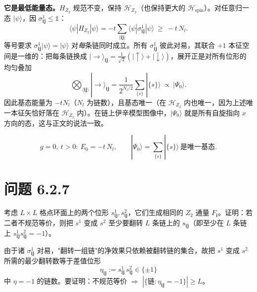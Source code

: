 \textbf{它是最低能量态。}$H_{Z_2}$ 规范不变，保持 $\mathcal{H}_{Z_2}$（也保持更大的 $\mathcal{H}_{\text{spin}}$）。对任意归一态 $|\psi\rangle$，因 $\sigma^1_{\pmb{ij}}\leqslant\mathbb{1}$：
\begin{equation*}
\langle\psi|H_{Z_2}|\psi\rangle
=-t\sum_{\langle\pmb{ij}\rangle}\langle\psi|\sigma^1_{\pmb{ij}}|\psi\rangle
\ \geqslant\ -t\,N_l .
\end{equation*}
等号要求 $\sigma^1_{\pmb{ij}}|\psi\rangle=|\psi\rangle$ 对\emph{每}条链同时成立。所有 $\sigma^1_{\pmb{ij}}$ 彼此对易，其联合 $+1$ 本征空间是一维的：把每条链换成 $|\rightarrow\rangle_{\pmb{ij}}=\frac{1}{\sqrt2}(|\uparrow\rangle+|\downarrow\rangle)$，展开正是对所有位形的均匀叠加
\begin{equation*}
\bigotimes_{\langle\pmb{ij}\rangle}|\rightarrow\rangle_{\pmb{ij}}
=\frac{1}{2^{N_l/2}}\sum_{\{s\}}|\{s\}\rangle\ \propto\ |\Psi_0\rangle .
\end{equation*}
因此基态能量为 $-tN_l$（$N_l$ 为链数），且基态唯一（在 $\mathcal{H}_{Z_2}$ 内也唯一，因为上述唯一本征矢恰好落在 $\mathcal{H}_{Z_2}$ 内）。在链上伊辛模型图像中，$|\Psi_0\rangle$ 就是所有自旋指向 $x$ 方向的态，这与正文的说法一致。

\begin{equation*}
\boxed{\ g=0,\ t>0:\ E_0=-t\,N_l,\qquad |\Psi_0\rangle=\sum_{\{s\}}|\{s\}\rangle\ \text{是唯一基态}.\ }
\end{equation*}

\section*{问题 6.2.7}
\begin{problem}
考虑 $L\times L$ 格点环面上的两个位形 $s^1_{\pmb{ij}},s^2_{\pmb{ij}}$，它们生成相同的 $Z_2$ 通量 $F_{\pmb i}$。证明：若二者不规范等价，则把 $s^1$ 变成 $s^2$ 至少要翻转 $L$ 条链上的 $s_{\pmb{ij}}$（即至少在 $L$ 条链上 $s^1_{\pmb{ij}}s^2_{\pmb{ij}}=-1$）。
\end{problem}
\solution

由于诸 $\sigma^1_{\pmb{ij}}$ 对易，"翻转一组链"的净效果只依赖被翻转链的集合，故把 $s^1$ 变成 $s^2$ 所需的最少翻转数等于差值位形
\begin{equation*}
\eta_{\pmb{ij}}:=s^1_{\pmb{ij}}\,s^2_{\pmb{ij}}\in\{\pm1\}
\end{equation*}
中 $\eta=-1$ 的链数。要证明：不规范等价 $\Rightarrow$ $|\{\text{链}:\eta_{\pmb{ij}}=-1\}|\geqslant L$。

